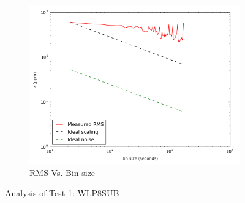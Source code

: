 \documentclass[conference]{IEEEtran}
\begin{document}
\begin{figure}[H]
    \begin{subfigure}{3}
        \includegraphics[scale=0.6]{rms_test1}
        \caption{RMS Vs. Bin size}
    \end{subfigure}
    \caption{Analysis of Test 1: WLP8SUB}
\end{figure}
\end{document}
